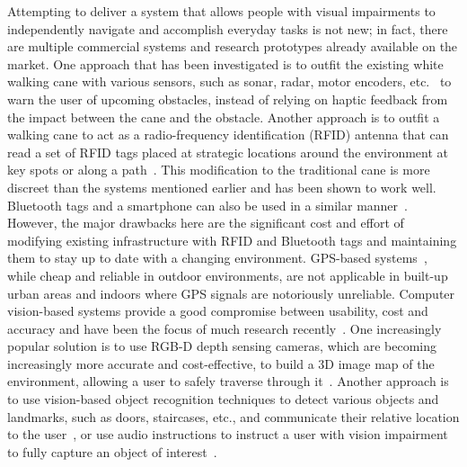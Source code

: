 \documentclass[sigconf, review=true, screen=true, anonymous=true]{acmart}
\begin{document}
Attempting to deliver a system that allows people with visual impairments to independently navigate and accomplish everyday tasks is not new; in fact, there are multiple commercial systems and research prototypes already available on the market.
One approach that has been investigated is to outfit the existing white walking cane with various sensors,
such as sonar, radar, motor encoders, etc.~\cite{ulrich1997, marion2008batcane} to warn the user of upcoming obstacles, instead of relying on haptic feedback from the impact between the cane and the obstacle.
Another approach is to outfit a walking cane to act as a radio-frequency identification (RFID) antenna that can read a set of RFID tags placed at strategic locations around the environment at key spots or along a path~\cite{faria2010electronic, willis2005}.
This modification to the traditional cane is more discreet than the systems mentioned earlier and has been shown to work well.
Bluetooth tags and a smartphone can also be used in a similar manner~\cite{sato2017navcog3}.
However, the major drawbacks here are the significant cost and effort of modifying existing infrastructure with RFID and Bluetooth tags and maintaining them to stay up to date with a changing environment.
GPS-based systems~\cite{ran2004drishti, loomis2001navigating, kammoun2012navigation}, while cheap and reliable in outdoor environments, are not applicable in built-up urban areas and indoors where GPS signals are notoriously unreliable.
Computer vision-based systems provide a good compromise between usability, cost and accuracy and have been the focus of much research recently~\cite{manduchi2014last}.
One increasingly popular solution is to use RGB-D depth sensing cameras, which are becoming increasingly more accurate and cost-effective, to build a 3D image map of the environment, allowing a user to safely traverse through it~\cite{lee2015, rodriguez2012obstacle}.
Another approach is to use vision-based object recognition techniques to detect various objects and landmarks, such as doors, staircases, etc., and communicate their relative location to the user~\cite{schauerte2012assistive, tian2013b, fiannaca2014headlock}, or use audio instructions to instruct a user with vision impairment to fully capture an object of interest~\cite{vazquez2012helping}. 
\end{document}
